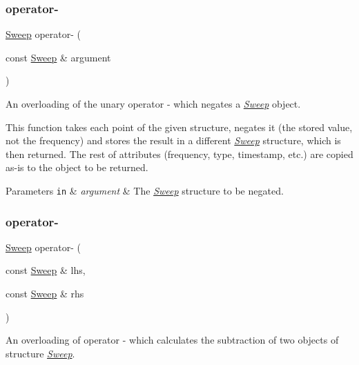 \subsubsection{\texorpdfstring{operator-\/}{operator-}\hspace{0.1cm}{\footnotesize\ttfamily [1/5]}}
{\footnotesize\ttfamily \hyperlink{structSweep}{Sweep} operator-\/ (\begin{DoxyParamCaption}\item[{const \hyperlink{structSweep}{Sweep} \&}]{argument }\end{DoxyParamCaption})\hspace{0.3cm}{\ttfamily [friend]}}



An overloading of the unary operator -\/ which negates a {\itshape \hyperlink{structSweep}{Sweep}} object. 

This function takes each point of the given structure, negates it (the stored value, not the frequency) and stores the result in a different {\itshape \hyperlink{structSweep}{Sweep}} structure, which is then returned. The rest of attributes (frequency, type, timestamp, etc.) are copied as-\/is to the object to be returned. 
\begin{DoxyParams}[1]{Parameters}
\mbox{\tt in}  & {\em argument} & The {\itshape \hyperlink{structSweep}{Sweep}} structure to be negated. \\
\hline
\end{DoxyParams}
\mbox{\label{structSweep_a8f704b31d015e4d81d25d3fceca1e2f1}} 
\subsubsection{\texorpdfstring{operator-\/}{operator-}\hspace{0.1cm}{\footnotesize\ttfamily [2/5]}}
{\footnotesize\ttfamily \hyperlink{structSweep}{Sweep} operator-\/ (\begin{DoxyParamCaption}\item[{const \hyperlink{structSweep}{Sweep} \&}]{lhs,  }\item[{const \hyperlink{structSweep}{Sweep} \&}]{rhs }\end{DoxyParamCaption})\hspace{0.3cm}{\ttfamily [friend]}}



An overloading of operator -\/ which calculates the subtraction of two objects of structure {\itshape \hyperlink{structSweep}{Sweep}}. 

